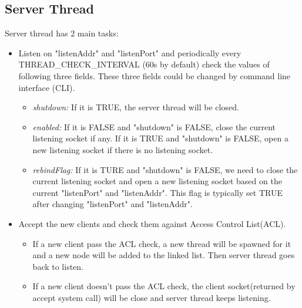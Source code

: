 \begin{itemize}
\subsection{Server Thread}
Server thread has 2 main tasks:
\begin{itemize}
\item{ Listen on "listenAddr" and "listenPort" and periodically every THREAD\_CHECK\_INTERVAL (60s by default) check the values of following three fields. These three fields could be changed by command line interface (CLI).}
	 \begin{itemize}
		\item{\emph{shutdown:} If it is TRUE, the server thread will be closed.}
		\item{\emph{enabled:}  If it is FALSE and "shutdown" is FALSE, close the current listening socket if any.  
									If it is TRUE and "shutdown" is FALSE,  open a new listening socket if there is no listening socket.}			
		\item{\emph{rebindFlag:} If it is TURE and "shutdown" is FALSE, we need to close the current listening socket and open a new listening socket based on the current "listenPort" and "listenAddr".
										This flag is typically set TRUE after changing "listenPort" and "listenAddr". }
		
		\end{itemize}
\item{ Accept the new clients and check them against Access Control List(ACL). }
	 \begin{itemize}
		\item{If a new client pass the ACL check, a new thread will be spawned for it and a new node will be added to the linked list. Then server thread goes back to listen.}
		\item{If a new client doesn't pass the ACL check, the client socket(returned by accept system call) will be close and server thread keeps listening.}
	\end{itemize}	
\end{itemize}


\end{itemize}
